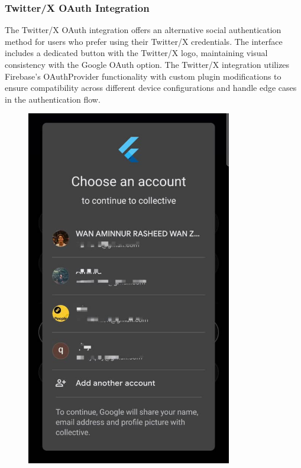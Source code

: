 \subsubsection{Twitter/X OAuth Integration}

The Twitter/X OAuth integration offers an alternative social authentication method for users who prefer using their Twitter/X credentials. The interface includes a dedicated button with the Twitter/X logo, maintaining visual consistency with the Google OAuth option. The Twitter/X integration utilizes Firebase's OAuthProvider functionality with custom plugin modifications to ensure compatibility across different device configurations and handle edge cases in the authentication flow.

\begin{figure}[H]
\centering
\begin{minipage}{0.4\textwidth}
\centering
\includegraphics[width=0.8\textwidth]{files/imgs/prototype/google_oauth.jpeg}

\end{minipage}
\end{figure}
